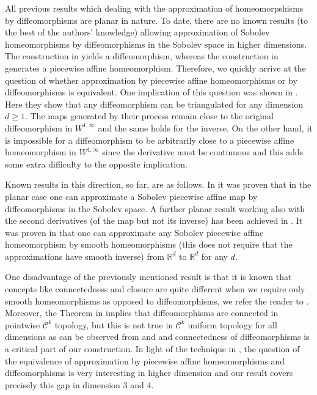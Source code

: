 \documentclass[12pt,a4paper]{amsart}
\theoremstyle{plain}
\theoremstyle{definition}
\numberwithin{equation}{section}
\def\er{\mathbb R}
\begin{document}
	All previous results which dealing with the approximation of homeomorpshisms by diffeomorphisms are planar in nature. To date, there are no known results (to the best of the authors' knowledge) allowing approximation of Sobolev homeomorphisms by diffeomorphisms in the Sobolev space in higher dimensions. The construction in \cite{IKO} yields a diffeomorphism, whereas the construction in \cite{HP} generates a piecewise affine homeomorphism. Therefore, we quickly arrive at the question of whether approximation by piecewise affine homeomorphisms or by diffeomorphisms is equivalent. One implication of this question was shown in \cite{IO2}. Here they show that any diffeomorphism can be triangulated for any dimension $d\geq 1$. The maps generated by their process remain close to the original diffeomorphism in $W^{1,\infty}$ and the same holds for the inverse. On the other hand, it is impossible for a diffeomorphism to be arbitrarily close to a piecewise affine homeomorphism in $W^{1,\infty}$ since the derivative must be continuous and this adds some extra difficulty to the opposite implication.
	
	Known results in this direction, so far, are as follows. In \cite{MP} it was proven that in the planar case one can approximate a Sobolev piecewise affine map by diffeomorphisms in the Sobolev space. A further planar result working also with the second derivatives (of the map but not its inverse) has been achieved in \cite{CH}. It was proven in \cite{CS} that one can approximate any Sobolev piecewise affine homeomorphism by smooth homeomorphisms (this does not require that the approximations have smooth inverse) from $\er^d$ to $\er^d$ for any $d$.
	
	One disadvantage of the previously mentioned result is that it is known that concepts like connectedness and closure are quite different when we require only smooth homeomorphisms as opposed to diffeomorphisms, we refer the reader to \cite{Rob2}. Moreover, the Theorem in \cite{Rob2} implies that diffeomorphisms are connected in pointwise $\mathcal{C}^k$ topology, but this is not true in $\mathcal{C}^k$ uniform topology for all dimensions as can be observed from \cite[Section II]{Hatcher50} and \cite[Table 1 and 2]{StableHomotopyGroups} and connectedness of diffeomorphisms is a critical part of our construction. In light of the technique in \cite{HP}, the question of the equivalence of approximation by piecewise affine homeomorphisms and diffeomorphisms is very interesting in higher dimension and our result covers precisely this gap in dimension 3 and 4.
	
\end{document}
